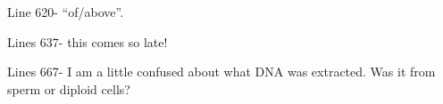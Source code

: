 
\begin{point}{} %
Line 620- ``of/above''.
\end{point}


\begin{point}{} %
Lines 637- this comes so late!
\end{point}


\begin{point}{} %
Lines 667- I am a little confused about what DNA was extracted. Was it
from sperm or diploid cells?
\end{point}


